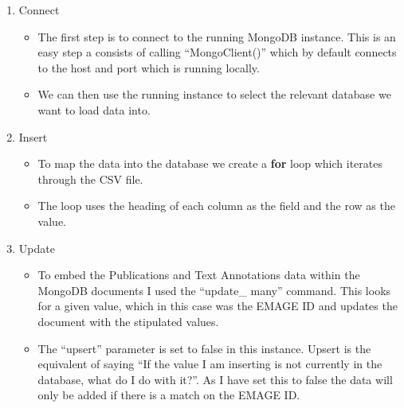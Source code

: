 \begin{enumerate}
\item Connect
\begin{itemize}
\item The first step is to connect to the running MongoDB instance. This is an easy step a consists of calling ``MongoClient()'' which by default connects to the host and port which is running locally.
\item We can then use the running instance to select the relevant database we want to load data into.
\end{itemize}
\item Insert
\begin{itemize}
\item To map the data into the database we create a \textbf{for} loop which iterates through the CSV file.
\item The loop uses the heading of each column as the field and the row as the value. \\[2em]
\end{itemize}
\item Update
\begin{itemize}
\item To embed the Publications and Text Annotations data within the MongoDB documents I used the ``update\_ many'' command. This looks for a given value, which in this case was the EMAGE ID and updates the document with the stipulated values.
\item The ``upsert'' parameter is set to false in this instance. Upsert is the equivalent of saying ``If the value I am inserting is not currently in the database, what do I do with it?''. As I have set this to false the data will only be added if there is a match on the EMAGE ID.
\end{itemize}
\end{enumerate}
\newpage
\vspace*{\fill}
